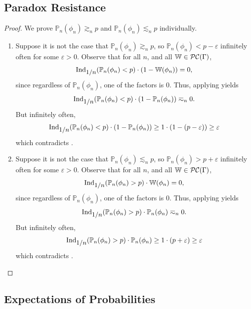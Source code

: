 \documentclass[authordate,onecolumn,noenvironments]{miri-tech-article}
\numberwithin{equation}{subsection}
\newcommand{\BelState}{\mathbb{P}}
\newcommand{\pt}{\BelState}
\newcommand{\cworlds}{\mathcal{P\-C}} %
\newcommand{\World}{\mathbb{W}}
\newcommand{\Theory}{\Gamma}
\newcommand{\ctsind}[1]{\operatorname{Ind}_{\text{\small{${#1}$}}}} %
\begin{document}
\subsection{Paradox Resistance}\label{app:lp}

\restatelp*

\begin{proof}

  We prove $\pt_n(\phi_n) \gtrsim_n p$ and $\pt_n(\phi_n) \lesssim_n p$ individually.
  \begin{enumerate}
    \item
      Suppose it is not the case that $\pt_n(\phi_n) \gtrsim_n p$, so $\pt_n(\phi_n) < p - \varepsilon$ infinitely often for some $\varepsilon > 0$.
      Observe that for all $n$, and all $\World \in \cworlds(\Theory)$,
      \[ \ctsind{1/n}(\pt_n(\phi_n) < p) \cdot (1 - \World(\phi_n)) = 0, \]
      since regardless of $\pt_n(\phi_n)$, one of the factors is 0.  Thus, applying  yields
      \begin{equation}\label{eq:lp1}
        \ctsind{1/n}(\pt_n(\phi_n) < p) \cdot (1 - \pt_n(\phi_n)) \eqsim_n 0.
      \end{equation}
      But infinitely often,
      \[ \ctsind{1/n}(\pt_n(\phi_n) < p) \cdot (1 - \pt_n(\phi_n)) \geq 1 \cdot (1 - (p - \varepsilon)) \geq \varepsilon \]
      which contradicts .
    \item
      Suppose it is not the case that $\pt_n(\phi_n) \lesssim_n p$, so $\pt_n(\phi_n) > p + \varepsilon$ infinitely often for some $\varepsilon > 0$.
      Observe that for all $n$, and all $\World \in \cworlds(\Theory)$,
      \[ \ctsind{1/n}(\pt_n(\phi_n) > p) \cdot \World(\phi_n) = 0, \]
      since regardless of $\pt_n(\phi_n)$, one of the factors is 0.  Thus, applying  yields
      \begin{equation}\label{eq:lp2}
        \ctsind{1/n}(\pt_n(\phi_n) > p) \cdot \pt_n(\phi_n) \eqsim_n 0.
      \end{equation}
      But infinitely often,
      \[ \ctsind{1/n}(\pt_n(\phi_n) > p) \cdot \pt_n(\phi_n) \geq 1 \cdot (p + \varepsilon) \geq \varepsilon \]
      which contradicts .
  \end{enumerate}

\end{proof}


\subsection{Expectations of Probabilities}\label{app:epr}
\end{document}
